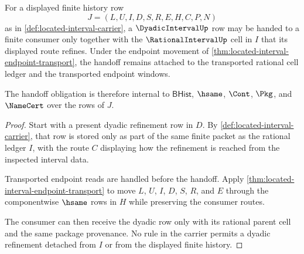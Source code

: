 \begin{theorem}
\label{thm:locatedinterval-dyadic-refinement-handoff}
For a displayed finite history row
$$
J=(L,U,I,D,S,R,E,H,C,P,N)
$$
as in \autoref{def:located-interval-carrier}, a $\DyadicIntervalUp$ row may be handed to a finite consumer only together with the $\RationalIntervalUp$ cell in $I$ that its displayed route refines. Under the endpoint movement of \autoref{thm:located-interval-endpoint-transport}, the handoff remains attached to the transported rational cell ledger and the transported endpoint windows.

The handoff obligation is therefore internal to $\mathsf{BHist}$, $\hsame$, $\Cont$, $\Pkg$, and $\NameCert$ over the rows of $J$.
\end{theorem}
\begin{proof}
Start with a present dyadic refinement row in $D$. By \autoref{def:located-interval-carrier}, that row is stored only as part of the same finite packet as the rational ledger $I$, with the route $C$ displaying how the refinement is reached from the inspected interval data.

Transported endpoint reads are handled before the handoff. Apply \autoref{thm:located-interval-endpoint-transport} to move $L$, $U$, $I$, $D$, $S$, $R$, and $E$ through the componentwise $\hsame$ rows in $H$ while preserving the consumer routes.

The consumer can then receive the dyadic row only with its rational parent cell and the same package provenance. No rule in the carrier permits a dyadic refinement detached from $I$ or from the displayed finite history.
\end{proof}

